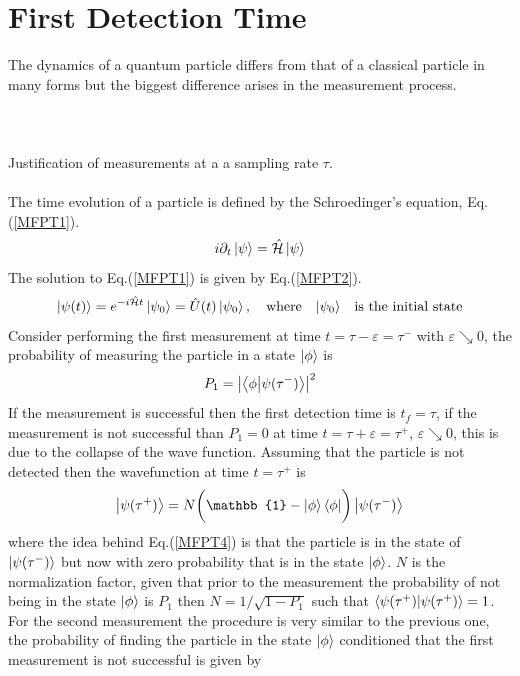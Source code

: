 \documentclass{article}
\numberwithin{equation}{section}
\renewcommand{\H}{\mathcal{\hat{H}}}
\newcommand{\1}{\mathbb{1}}
\newcommand{\state}{\ket{\phi}}
\newcommand{\projection}{\bra{\phi}}
\begin{document}
\section{First Detection Time}
The dynamics of a quantum particle differs from that of a classical particle in many forms but the biggest difference arises in the measurement process. 
\\
\\
\\
\\
Justification of measurements at a a sampling rate $\tau$. 
\\\\
The time evolution of a particle is defined by the Schroedinger's equation, Eq.(\ref{MFPT1}).
\begin{equation}\label{MFPT1}
    i\partial_t\ket{\psi}=\H\ket{\psi}
\end{equation}
The solution to Eq.(\ref{MFPT1}) is given by Eq.(\ref{MFPT2}).
\begin{equation}\label{MFPT2}
\ket{\psi(t)}=e^{-i\H t}\ket{\psi_0}=\hat{U}(t)\ket{\psi_0}, \quad \text{where} \quad {\ket{\psi_0}}\quad \text{is the initial state}
\end{equation}
Consider performing the first measurement at time $t=\tau-\varepsilon=\tau^-$ with $\varepsilon\searrow0$, the probability of measuring the particle in a state $\state$ is 
\begin{equation}\label{MFPT3}
    P_1=\abs{\projection\ket{\psi(\tau^-)}}^2
\end{equation}
If the measurement is successful then the first detection time is $t_f=\tau$, if the measurement is not successful than $P_1=0$ at time $t=\tau+\varepsilon=\tau^+$, $\varepsilon\searrow0$, this is due to the collapse of the wave function. Assuming that the particle is not detected then the wavefunction at time $t=\tau^+$ is
\begin{equation}\label{MFPT4}
    \ket{\psi(\tau^+)}=N\biggl(\1-\state\bra{\phi} \biggr)\ket{\psi(\tau^-)}
\end{equation}
where the idea behind Eq.(\ref{MFPT4}) is that the particle is in the state of $\ket{\psi(\tau^-)}$ but now with zero probability that is in the state $\state$. $N$ is the normalization factor, given that prior to the measurement the probability of not being in the state $\state$ is $P_1$ then $N=1/\sqrt{1-P_1}$ such that $\braket{\psi(\tau^+)}{\psi(\tau^+)}=1$.
\\
For the second measurement the procedure is very similar to the previous one, the probability of finding the particle in the state $\state$ conditioned that the first measurement is not successful is given by
\end{document}
